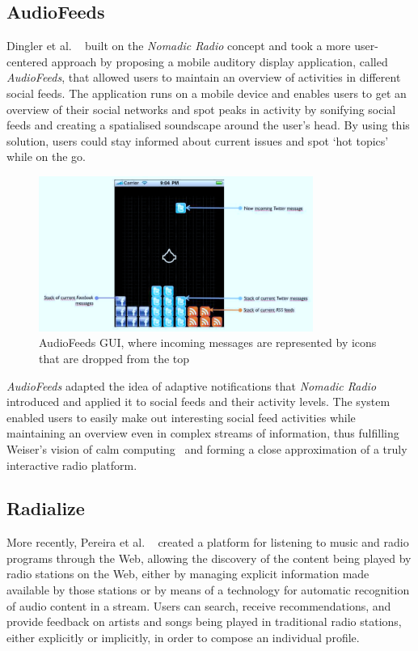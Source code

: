 \subsection{AudioFeeds}

Dingler et al. ~\cite{Dingler2010} built on the \textit{Nomadic Radio} concept and took a more user-centered approach by proposing a mobile auditory display application, called \textit{AudioFeeds}, that allowed users to maintain an overview of activities in different social feeds. The application runs on a mobile device and enables users to get an overview of their social networks and spot peaks in activity by sonifying social feeds and creating a spatialised soundscape around the user’s head. By using this solution, users could stay informed about current issues and spot ‘hot topics’ while on the go. 

\begin{figure}[h]
\centering
\includegraphics[width=0.8\textwidth]{./Images/audiofeeds.png}
\caption{AudioFeeds GUI, where incoming messages are represented by icons that are dropped from the top}
\label{fig:test_env}
\end{figure}

\textit{AudioFeeds} adapted the idea of adaptive notifications that \textit{Nomadic Radio} introduced and applied it to social feeds and their activity levels. The system enabled users to easily make out interesting social feed activities while maintaining an overview even in complex streams of information, thus fulfilling Weiser’s vision of calm computing~\cite{Weiser1997} and forming a close approximation of a truly interactive radio platform.


\subsection{Radialize}

More recently, Pereira et al. ~\cite{Pereira2013} created a platform for listening to music and radio programs through the Web, allowing the discovery of the content being played by radio stations on the Web, either by managing explicit information made available by those stations or by means of a technology for automatic recognition of audio content in a stream. Users can search, receive recommendations, and provide feedback on artists and songs being played in traditional radio stations, either explicitly or implicitly, in order to compose an individual profile.

